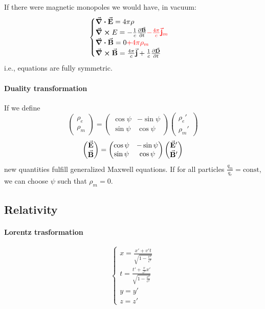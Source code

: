 If there were magnetic monopoles we would have, in vacuum:
$$\begin{cases}
	\div{\va{E}} = 4\pi \rho\\
	\curl{E} = -\frac{1}{c} \pdv{\va{B}}{t} \textcolor{red}{-\frac{4\pi}{c}\va{j}_m} \\
	\div{\va{B}} = 0\textcolor{red}{+4\pi \rho_m}\\
	\curl{\va{B}} = \frac{4\pi}{c} \va{j} + \frac{1}{c}\pdv{\va{D}}{t}
\end{cases}$$
i.e., equations are fully symmetric.
\paragraph{Duality transformation}
If we define 
$$\begin{pmatrix}
\rho_e\\\rho_m
\end{pmatrix} = \begin{pmatrix}
\cos \psi&-\sin \psi\\\sin \psi&\cos \psi
\end{pmatrix}\begin{pmatrix}
\rho_e'\\\rho_m'
\end{pmatrix}$$
$$\begin{pmatrix}
\va{E}\\\va{B}
\end{pmatrix} = \begin{pmatrix}
\cos \psi&-\sin \psi\\\sin \psi&\cos \psi
\end{pmatrix}\begin{pmatrix}
\va{E}'\\\va{B}'
\end{pmatrix}$$
new quantities fulfill generalized Maxwell equations. If for all particles $\frac{q_m}{q_e} = \text{const}$, we can choose $\psi$ such that $\rho_m = 0$.

\subsection{Relativity}
\paragraph{Lorentz trasformation}
$$\begin{cases}
x = \frac{x'+v't}{\sqrt{1-\frac{v^2}{c^2}}}\\
t = \frac{t'+\frac{v}{c^2}x'}{\sqrt{1-\frac{v^2}{c^2}}}\\
y=y'\\
z=z'
\end{cases}$$
